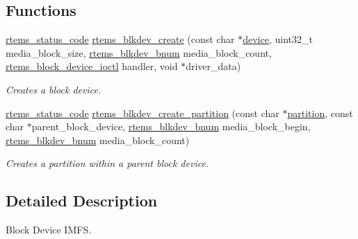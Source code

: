 \subsection*{Functions}
\begin{DoxyCompactItemize}
\item 
\mbox{\hyperlink{group__ClassicStatus_ga545d41846817eaba6143d52ee4d9e9fe}{rtems\+\_\+status\+\_\+code}} \mbox{\hyperlink{group__rtems__blkdev_gae2fe7e8c05fa9db0fa7c0ec4e8e4967d}{rtems\+\_\+blkdev\+\_\+create}} (const char $\ast$\mbox{\hyperlink{structdevice}{device}}, uint32\+\_\+t media\+\_\+block\+\_\+size, \mbox{\hyperlink{group__rtems__disk_ga5fbcfd40b657bff6c54d9e393fab3274}{rtems\+\_\+blkdev\+\_\+bnum}} media\+\_\+block\+\_\+count, \mbox{\hyperlink{group__rtems__disk_gacbf717f10129b976deaf8e6f4deb17ad}{rtems\+\_\+block\+\_\+device\+\_\+ioctl}} handler, void $\ast$driver\+\_\+data)
\begin{DoxyCompactList}\small\item\em Creates a block device. \end{DoxyCompactList}\item 
\mbox{\hyperlink{group__ClassicStatus_ga545d41846817eaba6143d52ee4d9e9fe}{rtems\+\_\+status\+\_\+code}} \mbox{\hyperlink{group__rtems__blkdev_ga9271a94a55c2d58494b2a43dcb55e13e}{rtems\+\_\+blkdev\+\_\+create\+\_\+partition}} (const char $\ast$\mbox{\hyperlink{structpartition}{partition}}, const char $\ast$parent\+\_\+block\+\_\+device, \mbox{\hyperlink{group__rtems__disk_ga5fbcfd40b657bff6c54d9e393fab3274}{rtems\+\_\+blkdev\+\_\+bnum}} media\+\_\+block\+\_\+begin, \mbox{\hyperlink{group__rtems__disk_ga5fbcfd40b657bff6c54d9e393fab3274}{rtems\+\_\+blkdev\+\_\+bnum}} media\+\_\+block\+\_\+count)
\begin{DoxyCompactList}\small\item\em Creates a partition within a parent block device. \end{DoxyCompactList}\end{DoxyCompactItemize}


\subsection{Detailed Description}
Block Device I\+M\+FS. 

